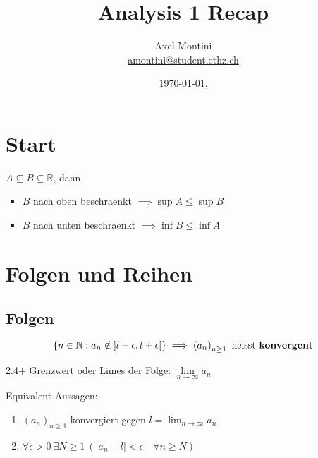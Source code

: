 \documentclass[8pt,a4paper,twocolumn,table]{extarticle}
\title{Analysis 1 Recap}
\author{Axel Montini \\ \href{mailto:amontini@student.ethz.ch}{amontini@student.ethz.ch}}
\date{\today \hfill \texttt{\branch}, \texttt{\commit}}
\newcommand{\N}{\mathbb{N}}
\newcommand{\R}{\mathbb{R}}
\newcommand{\seq}[1]{\left( #1_n \right)_{n \ge 1}}
\begin{document}
\maketitle

\section{Start}

\begin{korollar}{1.16}
    \label{korollar:inf-sup}
    $A \subseteq B \subseteq \R$, dann
    \begin{itemize}
        \item $B$ nach oben beschraenkt $\implies \sup A \le \sup B$
        \item $B$ nach unten beschraenkt $\implies \inf B \le \inf A$
    \end{itemize}
\end{korollar}

\section{Folgen und Reihen}
\subsection{Folgen}
\begin{definition}{2.4}
    \[
        \left\{ n \in \N : a_n \notin \left] l - \epsilon, l + \epsilon \right[ \right\} \implies \seq{a}\ \mbox{heisst \textbf{konvergent}}
    \]
\end{definition}

\begin{definition}{2.4+}
    Grenzwert oder Limes der Folge: $\underset{n \to \infty}{\lim} a_n$
\end{definition}

\begin{lemma}
    Equivalent Aussagen:
    \begin{enumerate}
        \item $\seq{a}$ konvergiert gegen $l = \lim_{n \to \infty} a_n$
        \item $\forall \epsilon > 0\ \exists N \ge 1\ \left( \lvert a_n - l \rvert < \epsilon \quad \forall n \ge N \right)$
    \end{enumerate}
\end{lemma}
\end{document}
